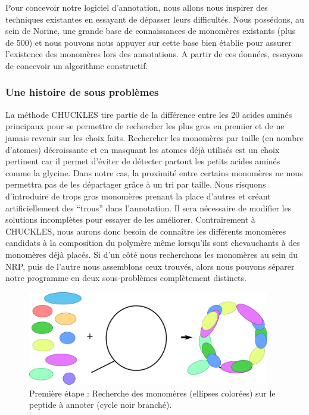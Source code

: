 Pour concevoir notre logiciel d'annotation, nous allons nous inspirer des techniques existantes en essayant de dépasser leurs difficultés.
Nous possédons, au sein de Norine, une grande base de connaissances de monomères existants (plus de 500) et nous pouvons nous appuyer sur cette base bien établie pour assurer l'existence des monomères lors des annotations.
A partir de ces données, essayons de concevoir un algorithme constructif.


\subsubsection{Une histoire de sous problèmes}
\label{subproblems}

La méthode CHUCKLES tire partie de la différence entre les 20 acides aminés principaux pour se permettre de rechercher les plus gros en premier et de ne jamais revenir sur les choix faits.
Rechercher les monomères par taille (en nombre d'atomes) décroissante et en masquant les atomes déjà utilisés est un choix pertinent car il permet d'éviter de détecter partout les petits acides aminés comme la glycine.
Dans notre cas, la proximité entre certains monomères ne nous permettra pas de les départager grâce à un tri par taille.
Nous risquons d'introduire de trops gros monomères prenant la place d'autres et créant artificiellement des ``trous'' dans l'annotation.
Il sera nécessaire de modifier les solutions incomplètes pour essayer de les améliorer.
Contrairement à CHUCKLES, nous aurons donc besoin de connaître les différents monomères candidats à la composition du polymère même lorsqu'ils sont chevauchants à des monomères déjà placés.
Si d'un côté nous recherchons les monomères au sein du NRP, puis de l'autre nous assemblons ceux trouvés, alors nous pouvons séparer notre programme en deux sous-problèmes complètement distincts.

\begin{figure}[!ht]
  \begin{center}
    \includegraphics[width=400px]{Figures/s2m/Intro/searching.png}
    \caption{\label{search_fig}Première étape : Recherche des monomères (ellipses colorées) sur le peptide à annoter (cycle noir branché).}
  \end{center}
\end{figure}

